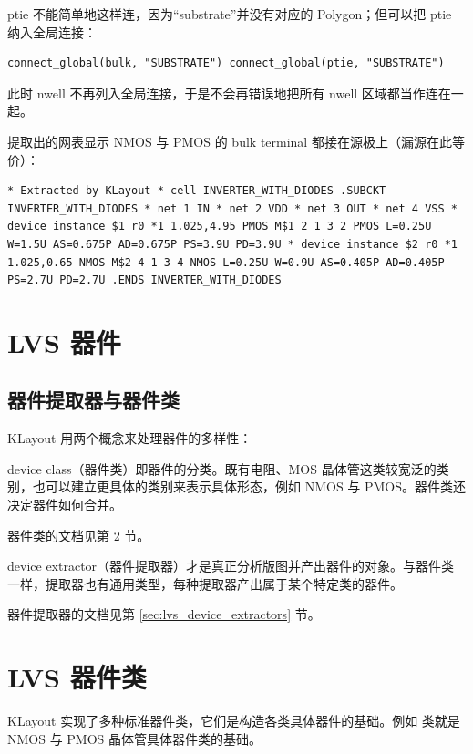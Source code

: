 ptie 不能简单地这样连，因为“substrate”并没有对应的 Polygon；但可以把 ptie 纳入全局连接：

\begin{lstlisting}
connect_global(bulk, "SUBSTRATE") connect_global(ptie, "SUBSTRATE")
\end{lstlisting}

此时 nwell 不再列入全局连接，于是不会再错误地把所有 nwell 区域都当作连在一起。

提取出的网表显示 NMOS 与 PMOS 的 bulk terminal 都接在源极上（漏源在此等价）：

\begin{lstlisting}
* Extracted by KLayout * cell INVERTER_WITH_DIODES .SUBCKT INVERTER_WITH_DIODES * net 1 IN * net 2 VDD * net 3 OUT * net 4 VSS * device instance $1 r0 *1 1.025,4.95 PMOS M$1 2 1 3 2 PMOS L=0.25U W=1.5U AS=0.675P AD=0.675P PS=3.9U PD=3.9U * device instance $2 r0 *1 1.025,0.65 NMOS M$2 4 1 3 4 NMOS L=0.25U W=0.9U AS=0.405P AD=0.405P PS=2.7U PD=2.7U .ENDS INVERTER_WITH_DIODES
\end{lstlisting}

\section{LVS 器件}\label{sec:lvs_devices}

\subsection{器件提取器与器件类}

KLayout 用两个概念来处理器件的多样性：

device class（器件类）即器件的分类。既有电阻、MOS 晶体管这类较宽泛的类别，也可以建立更具体的类别来表示具体形态，例如 NMOS 与 PMOS。器件类还决定器件如何合并。

器件类的文档见第 \ref{sec:lvs_device_classes} 节。

device extractor（器件提取器）才是真正分析版图并产出器件的对象。与器件类一样，提取器也有通用类型，每种提取器产出属于某个特定类的器件。

器件提取器的文档见第 \ref{sec:lvs_device_extractors} 节。

\section{LVS 器件类}\label{sec:lvs_device_classes}

KLayout 实现了多种标准器件类，它们是构造各类具体器件的基础。例如  类就是 NMOS 与 PMOS 晶体管具体器件类的基础。

